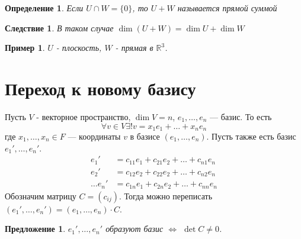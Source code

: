 \documentclass[a4paper,12pt]{article}
\newtheorem*{Def}{Определение}
\newtheorem*{Suggestion}{Предложение}
\newtheorem*{Examples}{Пример}
\newtheorem*{Consequence}{Следствие}
\begin{document}
\begin{Def}
Если $U \cap W = \{0\}$, то $U + W$ называется прямой суммой
\end{Def}
\begin{Consequence}
В таком случае $\dim\left(U+W\right) = \dim U + \dim W$
\end{Consequence}
\begin{Examples}
    $U$ - плоскость, $W$ - прямая в $\mathbb{R}^3$.
\end{Examples}

\section*{Переход к новому базису}
Пусть $V$ - векторное пространство, $\dim V = n$, $e_1, \ldots, e_n$ --- базис. То есть
\[
\forall v \in V \exists ! v = x_1e_1 + \ldots + x_ne_n
\]
где $x_1, \ldots, x_n \in F$ --- координаты $v$ в базисе $\left(e_1, \ldots, e_n\right)$. 
Пусть также есть базис $e_1', \ldots, e_n'$. 
\begin{align*}
    e_1' &= c_{11}e_1 + c_{21}e_2 + \ldots + c_{n1}e_n\\
    e_2' &= c_{12}e_2 + c_{22}e_2 + \ldots + c_{n2}e_n\\
    \ldots
    e_n' &= c_{1n}e_1 + c_{2n}e_2 + \ldots + c_{nn}e_n
\end{align*}
Обозначим матрицу $C = \left(c_{ij}\right)$. Тогда можно переписать $\left(e_1', \ldots, e_n'\right) = \left(e_1, \ldots, e_n\right)\cdot C$.
\begin{Suggestion}
$e_1', \ldots, e_n'$ образуют базис $\Leftrightarrow$ $\det C \neq 0$.
\end{Suggestion}
\end{document}
